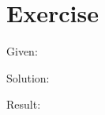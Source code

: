 \documentclass[a4paper, 10pt]{scrartcl}
\begin{document}
\section{Exercise}

Given:

Solution:

Result:
\end{document}
